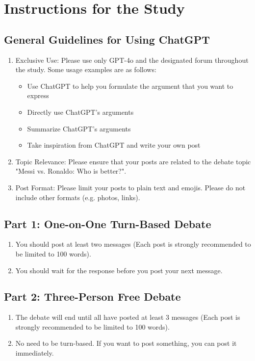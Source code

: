 \newpage
\onecolumn
\section{Instructions for the Study}
\label{A}
\subsection{General Guidelines for Using ChatGPT}
\begin{enumerate}
    \item{Exclusive Use: Please use only GPT-4o and the designated forum throughout the study. Some usage examples are as follows: 
    \begin{itemize}
        \item{Use ChatGPT to help you formulate the argument that you want to express}
        \item{Directly use ChatGPT's arguments}
        \item{Summarize ChatGPT's arguments}
        \item{Take inspiration from ChatGPT and write your own post}
    \end{itemize}}
    \item{Topic Relevance: Please ensure that your posts are related to the debate topic "Messi vs. Ronaldo: Who is better?".}
    \item{Post Format: Please limit your posts to plain text and emojis. Please do not include other formats (e.g. photos, links).}
\end{enumerate}

\subsection{Part 1: One-on-One Turn-Based Debate}
\begin{enumerate}
    \item{You should post at least two messages (Each post is strongly recommended to be limited to 100 words).}
    \item{You should wait for the response before you post your next message.}
\end{enumerate}

\subsection{Part 2: Three-Person Free Debate}
\begin{enumerate}
    \item{The debate will end until all have posted at least 3 messages (Each post is strongly recommended to be limited to 100 words).}
    \item{No need to be turn-based. If you want to post something, you can post it immediately.}
\end{enumerate}

